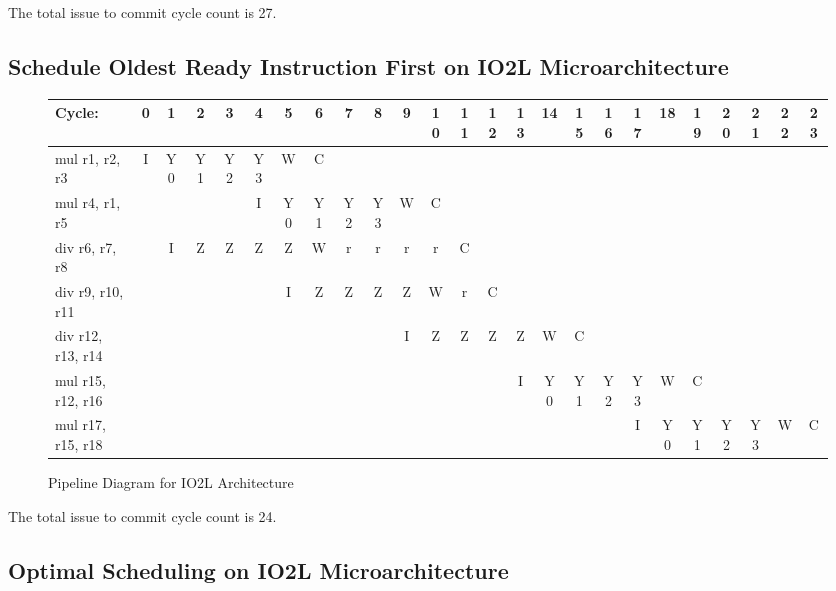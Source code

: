 \documentclass[10pt]{article}
\begin{document}
The total issue to commit cycle count is 27.

\subsection{Schedule Oldest Ready Instruction First on IO2L Microarchitecture}

\begin{figure}[H]
\centering
{\setlength{\tabcolsep}{2pt}
\begin{tabular}{|l!{\vrule width 1.5pt}c|c|c|c|c|c|c|c|c|c|c|c|c|c|c|c|c|c|c|c|c|c|c|c!{\vrule width 1.5pt}}
\hline
Cycle:            & 0 & 1 & 2 & 3 & 4 & 5 & 6 & 7 & 8 & 9 & 10 & 11 & 12 & 13 & 14 & 15 & 16 & 17 & 18 & 19 & 20 & 21 & 22 & 23 \\ \hline
mul r1, r2, r3    & I & Y0& Y1& Y2& Y3& W & C &   &   &   &    &    &    &    &    &    &    &    &    &    &    &    &    &    \\ \hline
mul r4, r1, r5    &   &   &   &   & I & Y0& Y1& Y2& Y3& W & C  &    &    &    &    &    &    &    &    &    &    &    &    &    \\ \hline
div r6, r7, r8    &   & I & Z & Z & Z & Z & W & r & r & r & r  & C  &    &    &    &    &    &    &    &    &    &    &    &    \\ \hline
div r9, r10, r11  &   &   &   &   &   & I & Z & Z & Z & Z & W  & r  & C  &    &    &    &    &    &    &    &    &    &    &    \\ \hline
div r12, r13, r14 &   &   &   &   &   &   &   &   &   & I & Z  & Z  & Z  & Z  & W  & C  &    &    &    &    &    &    &    &    \\ \hline
mul r15, r12, r16 &   &   &   &   &   &   &   &   &   &   &    &    &    & I  & Y0 & Y1 & Y2 & Y3 & W  & C  &    &    &    &    \\ \hline
mul r17, r15, r18 &   &   &   &   &   &   &   &   &   &   &    &    &    &    &    &    &    & I  & Y0 & Y1 & Y2 & Y3 & W  & C  \\ \hline
\end{tabular}
}
\caption{Pipeline Diagram for IO2L Architecture}
\end{figure}

The total issue to commit cycle count is 24.

\subsection{Optimal Scheduling on IO2L Microarchitecture}
\end{document}
